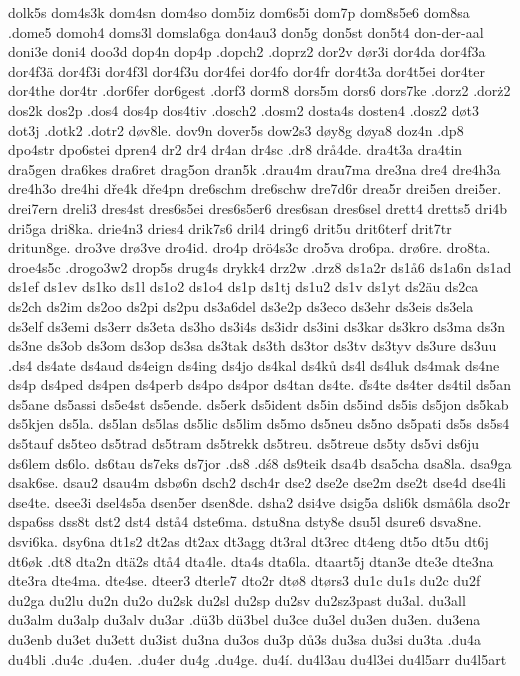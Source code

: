dolk5s
dom4s3k
dom4sn
dom4so
dom5iz
dom6s5i
dom7p
dom8s5e6
dom8sa
.dome5
domoh4
doms3l
domsla6ga
don4au3
don5g
don5st
don5t4
don-der-aal
doni3e
doni4
doo3d
dop4n
dop4p
.dopch2
.doprz2
dor2v
dør3i
dor4da
dor4f3a
dor4f3ä
dor4f3i
dor4f3l
dor4f3u
dor4fei
dor4fo
dor4fr
dor4t3a
dor4t5ei
dor4ter
dor4the
dor4tr
.dor6fer
dor6gest
.dorf3
dorm8
dors5m
dors6
dors7ke
.dorz2
.dorż2
dos2k
dos2p
.dos4
dos4p
dos4tiv
.dosch2
.dosm2
dosta4s
dosten4
.dosz2
døt3
dot3j
.dotk2
.dotr2
døv8le.
dov9n
dover5s
dow2s3
døy8g
døya8
doz4n
.dp8
dpo4str
dpo6stei
dpren4
dr2
dr4
dr4an
dr4sc
.dr8
drå4de.
dra4t3a
dra4tin
dra5gen
dra6kes
dra6ret
drag5on
dran5k
.drau4m
drau7ma
dre3na
dre4
dre4h3a
dre4h3o
dre4hi
dře4k
dře4pn
dre6schm
dre6schw
dre7d6r
drea5r
drei5en
drei5er.
drei7ern
dreli3
dres4st
dres6s5ei
dres6s5er6
dres6san
dres6sel
drett4
dretts5
dri4b
dri5ga
dri8ka.
drie4n3
dries4
drik7s6
dril4
dring6
drit5u
drit6terf
drit7tr
dritun8ge.
dro3ve
drø3ve
dro4id.
dro4p
drö4s3c
dro5va
dro6pa.
drø6re.
dro8ta.
droe4s5c
.drogo3w2
drop5s
drug4s
drykk4
drz2w
.drz8
ds1a2r
ds1å6
ds1a6n
ds1ad
ds1ef
ds1ev
ds1ko
ds1l
ds1o2
ds1o4
ds1p
ds1tj
ds1u2
ds1v
ds1yt
ds2äu
ds2ca
ds2ch
ds2im
ds2oo
ds2pi
ds2pu
ds3a6del
ds3e2p
ds3eco
ds3ehr
ds3eis
ds3ela
ds3elf
ds3emi
ds3err
ds3eta
ds3ho
ds3i4s
ds3idr
ds3ini
ds3kar
ds3kro
ds3ma
ds3n
ds3ne
ds3ob
ds3om
ds3op
ds3sa
ds3tak
ds3th
ds3tor
ds3tv
ds3tyv
ds3ure
ds3uu
.ds4
ds4ate
ds4aud
ds4eign
ds4ing
ds4jo
ds4kal
ds4ků
ds4l
ds4luk
ds4mak
ds4ne
ds4p
ds4ped
ds4pen
ds4perb
ds4po
ds4por
ds4tan
ds4te.
ďs4te
ds4ter
ds4til
ds5an
ds5ane
ds5assi
ds5e4st
ds5ende.
ds5erk
ds5ident
ds5in
ds5ind
ds5is
ds5jon
ds5kab
ds5kjen
ds5la.
ds5lan
ds5las
ds5lic
ds5lim
ds5mo
ds5neu
ds5no
ds5pati
ds5s
ds5s4
ds5tauf
ds5teo
ds5trad
ds5tram
ds5trekk
ds5treu.
ds5treue
ds5ty
ds5vi
ds6ju
ds6lem
ds6lo.
ds6tau
ds7eks
ds7jor
.ds8
.dś8
ds9teik
dsa4b
dsa5cha
dsa8la.
dsa9ga
dsak6se.
dsau2
dsau4m
dsbø6n
dsch2
dsch4r
dse2
dse2e
dse2m
dse2t
dse4d
dse4li
dse4te.
dsee3i
dsel4s5a
dsen5er
dsen8de.
dsha2
dsi4ve
dsig5a
dsli6k
dsmå6la
dso2r
dspa6ss
dss8t
dst2
dst4
dstå4
dste6ma.
dstu8na
dsty8e
dsu5l
dsure6
dsva8ne.
dsvi6ka.
dsy6na
dt1s2
dt2as
dt2ax
dt3agg
dt3ral
dt3rec
dt4eng
dt5o
dt5u
dt6j
dt6øk
.dt8
dta2n
dtä2s
dtå4
dta4le.
dta4s
dta6la.
dtaart5j
dtan3e
dte3e
dte3na
dte3ra
dte4ma.
dte4se.
dteer3
dterle7
dto2r
dtø8
dtørs3
du1c
du1s
du2c
du2f
du2ga
du2lu
du2n
du2o
du2sk
du2sl
du2sp
du2sv
du2sz3past
du3al.
du3all
du3alm
du3alp
du3alv
du3ar
.dü3b
dü3bel
du3ce
du3el
du3en
du3en.
du3ena
du3enb
du3et
du3ett
du3ist
du3na
du3os
du3p
dů3s
du3sa
du3si
du3ta
.du4a
du4bli
.du4c
.du4en.
.du4er
du4g
.du4ge.
du4í.
du4l3au
du4l3ei
du4l5arr
du4l5art
